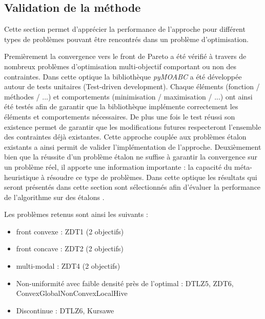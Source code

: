 \subsection{Validation de la méthode} %
\label{sub:validation_de_la_methode}
Cette section permet d’apprécier la performance de l’approche pour différent types
de problèmes pouvant être rencontrés dans un problème d’optimisation.


Premièrement la convergence vers le front de Pareto a été vérifié à travers de nombreux
problèmes d’optimisation multi-objectif comportant ou non des contraintes.
Dans cette optique la bibliothèque \emph{pyMOABC} a été développée autour de tests unitaires
(Test-driven development).
Chaque éléments (fonction / méthodes / ...) et comportements (minimisation / maximisation / ...)
ont ainsi été testés afin de garantir que la bibliothèque implémente correctement
les éléments et comportements nécessaires. De plus une fois le test réussi son existence
permet de garantir que les modifications futures respecteront l’ensemble des contraintes
déjà existantes.
Cette approche couplée aux problèmes étalon existants a ainsi permit de valider
l’implémentation de l’approche.
Deuxièmement bien que la réussite d’un problème étalon ne suffise à garantir la
convergence sur un problème réel, il apporte une information importante : la capacité
du méta-heuristique à résoudre ce type de problèmes. Dans cette optique les résultats
qui seront présentés dans cette section sont sélectionnés afin d’évaluer la performance
de l’algorithme sur des étalons .

Les problèmes retenus sont ainsi les suivants :
\begin{itemize}
  \item front convexe : ZDT1 (2 objectifs)
  \item front concave : ZDT2 (2 objectifs)
  \item multi-modal : ZDT4 (2 objectifs)
  \item Non-uniformité avec faible densité près de l’optimal : DTLZ5, ZDT6, ConvexGlobalNonConvexLocalHive
  \item Discontinue : DTLZ6, Kursawe
\end{itemize}








































